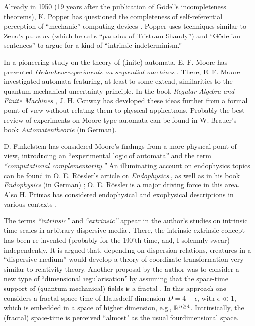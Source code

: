 \documentclass{article}
\begin{document}
 Already in 1950 (19 years after the publication of G\"odel's
 incompleteness theorems),
 K. Popper has questioned the completeness of self-referential
 perception
 of ``mechanic'' computing devices \cite{popper-50}. Popper uses
 techniques similar to
 Zeno's paradox (which he calls  ``paradox of Tristram Shandy'')
 and ``G\"odelian sentences'' to argue for a kind of ``intrinsic
 indeterminism.''

 In a pioneering study on the theory of (finite) automata, E. F. Moore
 has presented {\sl
 Gedanken-experiments on sequential machines} \cite{moore}.
 There, E. F. Moore
 investigated  automata featuring, at least to some extend,
 similarities to the quantum mechanical
 uncertainty principle.
 In the book {\sl Regular Algebra and Finite Machines} \cite{conway},
 J. H. Conway has developed these ideas further from a formal point of
 view without relating them to physical applications.
 Probably the best review of experiments on Moore-type automata can be
 found in W. Brauer's book {\sl Automatentheorie} \cite{brauer-84} (in
 German).

 D. Finkelstein \cite{finkelstein-79,finkelstein-83} has considered
 Moore's findings from a more physical point of view, introducing an
 ``experimental logic of automata'' and  the term
 {\em ``computational complementarity.''}
 An illuminating account on endophysics topics can be
 found in O. E. R\"ossler's article on {\sl Endophysics}
 \cite{roessler-87}, as well as in his book {\sl Endophysics}
(in German)  \cite{roessler-92};
 O. E. R\"ossler is a major driving
force in this area.
 Also H. Primas has considered endophysical and exophysical
 descriptions in various contexts \cite{primas-88}.

 The terms {\em ``intrinsic''} and {\em ``extrinsic''} appear
 in the author's studies on
 intrinsic time scales in arbitrary dispersive media
  \cite{svo-83,svo-86,svo5}. There, the intrinsic-extrinsic concept
 has been re-invented (probably for the 100'th time, and, I solemnly
 swear)
 independently. It is argued  that, depending on dispersion relations,
 creatures in a ``dispersive medium''
 would develop a theory of coordinate transformation very similar to
 relativity theory.
 Another proposal by the author was to consider a new type of
 ``dimensional
 regularisation'' by assuming that the space-time
support of
 (quantum mechanical) fields is a fractal
 \cite{sv4}.
 In this approach one considers a fractal space-time of Hausdorff
 dimension $D=4-\epsilon$, with $\epsilon \ll 1$,
 which is embedded in a space of higher dimension, e.g., ${\Bbb R}^{n\ge 4}$.
 Intrinsically, the (fractal)
 space-time is perceived ``almost'' as the usual fourdimensional
space.
\end{document}

